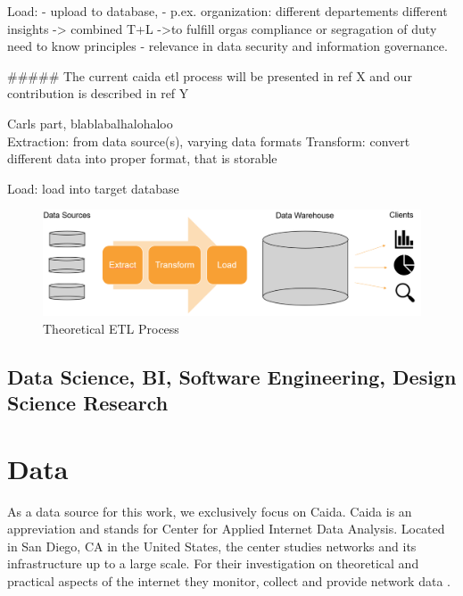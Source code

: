 \documentclass[conference, 11pt]{IEEEtran}
\begin{document}
Load:
- upload to database,
- p.ex. organization: different departements different insights -> combined T+L ->to fulfill orgas compliance or segragation of duty need to know principles - relevance in data security and information governance.

#####
The current caida etl process will be presented in ref X
and our contribution is described in ref Y






Carls part, blablabalhalohaloo \\ 

Extraction: from data source(s), varying data formats
Transform: convert different data into proper format, that is storable

Load: load into target database

\fi



\begin{figure}[htbp]
\centerline{\includegraphics[scale=0.3]{Graphics/ETLTheory.PNG}}
\caption{Theoretical ETL Process}
\label{fig}
\end{figure}




\subsection{Data Science, BI, Software Engineering, Design Science Research} 



\section{Data}
As a data source for this work, we exclusively focus on Caida. Caida is an appreviation and stands for Center for Applied Internet Data Analysis. Located in San Diego, CA in the United States, the center studies networks and its infrastructure up to a large scale. For their investigation on theoretical and practical aspects of the internet they monitor, collect and provide network data \cite{Caida}. 
\end{document}
